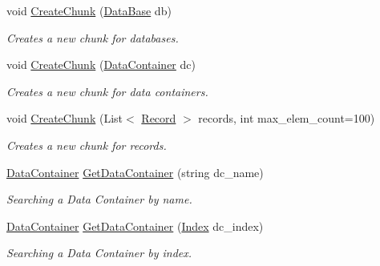 \begin{DoxyCompactItemize}
\item 
void \hyperlink{class_dwarf_d_b_1_1_chunk_manager_1_1_chunk_manager_a88c934e118ea03cdc8e99290f65a967a}{CreateChunk} (\hyperlink{class_dwarf_d_b_1_1_data_structures_1_1_data_base}{DataBase} db)
\begin{DoxyCompactList}\small\item\em Creates a new chunk for databases. \item\end{DoxyCompactList}\item 
void \hyperlink{class_dwarf_d_b_1_1_chunk_manager_1_1_chunk_manager_a9cc2ba0706faf8e49af4a098f0ffffd5}{CreateChunk} (\hyperlink{class_dwarf_d_b_1_1_data_structures_1_1_data_container}{DataContainer} dc)
\begin{DoxyCompactList}\small\item\em Creates a new chunk for data containers. \item\end{DoxyCompactList}\item 
void \hyperlink{class_dwarf_d_b_1_1_chunk_manager_1_1_chunk_manager_a96ab6bd09f2a5b1d05fe92163e40b512}{CreateChunk} (List$<$ \hyperlink{class_dwarf_d_b_1_1_data_structures_1_1_record}{Record} $>$ records, int max\_\-elem\_\-count=100)
\begin{DoxyCompactList}\small\item\em Creates a new chunk for records. \item\end{DoxyCompactList}\item 
\hyperlink{class_dwarf_d_b_1_1_data_structures_1_1_data_container}{DataContainer} \hyperlink{class_dwarf_d_b_1_1_chunk_manager_1_1_chunk_manager_ae7fb3a97ffa480b023785dfca48e18ec}{GetDataContainer} (string dc\_\-name)
\begin{DoxyCompactList}\small\item\em Searching a Data Container by name. \item\end{DoxyCompactList}\item 
\hyperlink{class_dwarf_d_b_1_1_data_structures_1_1_data_container}{DataContainer} \hyperlink{class_dwarf_d_b_1_1_chunk_manager_1_1_chunk_manager_ac7362867e884632398fb26cf4f0ef9b5}{GetDataContainer} (\hyperlink{class_dwarf_d_b_1_1_data_structures_1_1_index}{Index} dc\_\-index)
\begin{DoxyCompactList}\small\item\em Searching a Data Container by index. \item\end{DoxyCompactList}\item 

\end{DoxyCompactItemize}
